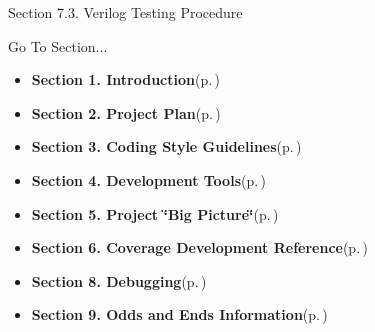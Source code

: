 \begin{Desc}
\item[Section 7.3. Verilog Testing Procedure]\end{Desc}




\begin{Desc}
\item[Go To Section...]\begin{itemize}
\item {\bf Section 1.  Introduction}{\rm (p.\,\pageref{page_intro})}\item {\bf Section 2.  Project Plan}{\rm (p.\,\pageref{page_project_plan})}\item {\bf Section 3.  Coding Style Guidelines}{\rm (p.\,\pageref{page_code_style})}\item {\bf Section 4.  Development Tools}{\rm (p.\,\pageref{page_tools})}\item {\bf Section 5.  Project \char`\"{}Big Picture\char`\"{}}{\rm (p.\,\pageref{page_big_picture})}\item {\bf Section 6.  Coverage Development Reference}{\rm (p.\,\pageref{page_code_details})}\item {\bf Section 8.  Debugging}{\rm (p.\,\pageref{page_debugging})}\item {\bf Section 9.  Odds and Ends Information}{\rm (p.\,\pageref{page_misc})} \end{itemize}
\end{Desc}
